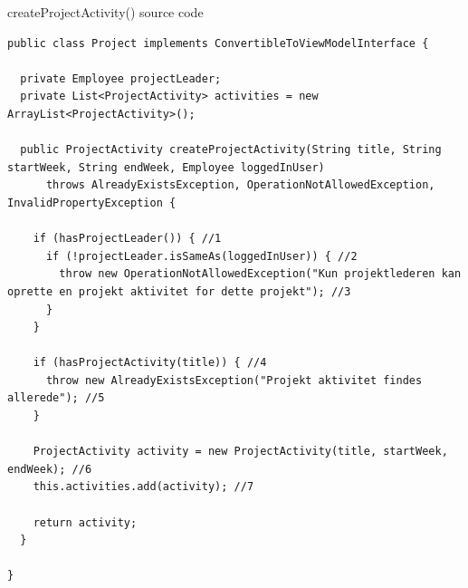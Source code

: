 \begin{listing}[H]
    \centering
    \caption{createProjectActivity() source code}\label{lst:create_project_activity_source}
    \begin{verbatim}
public class Project implements ConvertibleToViewModelInterface {

  private Employee projectLeader;
  private List<ProjectActivity> activities = new ArrayList<ProjectActivity>();

  public ProjectActivity createProjectActivity(String title, String startWeek, String endWeek, Employee loggedInUser)
      throws AlreadyExistsException, OperationNotAllowedException, InvalidPropertyException {
        
    if (hasProjectLeader()) { //1
      if (!projectLeader.isSameAs(loggedInUser)) { //2
        throw new OperationNotAllowedException("Kun projektlederen kan oprette en projekt aktivitet for dette projekt"); //3
      }
    }
    
    if (hasProjectActivity(title)) { //4
      throw new AlreadyExistsException("Projekt aktivitet findes allerede"); //5
    }
    
    ProjectActivity activity = new ProjectActivity(title, startWeek, endWeek); //6
    this.activities.add(activity); //7

    return activity;
  }
  
}

    \end{verbatim}
\end{listing}
